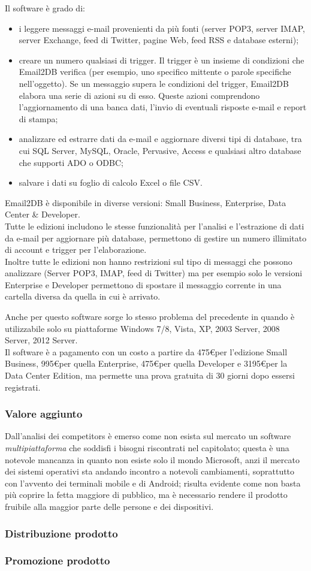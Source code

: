 Il software è grado di:
\begin{itemize}
\item i leggere messaggi e-mail provenienti da più fonti (server POP3, server IMAP, server Exchange, feed di Twitter, pagine Web, feed RSS e database esterni);
\item creare un numero qualsiasi di trigger. Il trigger è un insieme di condizioni che Email2DB verifica (per esempio, uno specifico mittente o parole specifiche nell'oggetto). Se un messaggio supera le condizioni del trigger, Email2DB elabora una serie di azioni su di esso. Queste azioni comprendono l'aggiornamento di una banca dati, l'invio di eventuali risposte e-mail e report di stampa;
\item analizzare ed estrarre dati da e-mail e aggiornare diversi tipi di database, tra cui SQL Server, MySQL, Oracle, Pervasive, Access e qualsiasi altro database che supporti ADO o ODBC;
\item salvare i dati su foglio di calcolo Excel o file CSV.
\end{itemize}

Email2DB è disponibile in diverse versioni: Small Business, Enterprise, Data Center \& Developer.\\
Tutte le edizioni includono le stesse funzionalità per l'analisi e l'estrazione di dati da e-mail per aggiornare più database, permettono di gestire un numero illimitato di account e trigger per l'elaborazione.\\
Inoltre tutte le edizioni non hanno restrizioni sul tipo di messaggi che possono analizzare (Server POP3, IMAP, feed di Twitter) ma per esempio solo le versioni Enterprise e Developer permettono di spostare il messaggio corrente in una cartella diversa da quella in cui è arrivato.

Anche per questo software sorge lo stesso problema del precedente in quando è utilizzabile solo su piattaforme Windows 7/8, Vista, XP, 2003 Server, 2008 Server, 2012 Server.\\
Il software è a pagamento con un costo a partire da 475\euro per l'edizione Small Business, 995\euro per quella Enterprise, 475\euro per quella Developer e 3195\euro per la Data Center Edition, ma permette una prova gratuita di 30 giorni dopo essersi registrati.

\subsubsection{Valore aggiunto}
Dall'analisi dei competitors è emerso come non esista sul mercato un software \emph{multipiattaforma} che soddisfi i bisogni riscontrati nel capitolato; questa è una notevole mancanza in quanto non esiste solo il mondo Microsoft, anzi il mercato dei sistemi operativi sta andando incontro a notevoli cambiamenti, soprattutto con l'avvento dei terminali mobile e di Android; risulta evidente come non basta più coprire la fetta maggiore di pubblico, ma è necessario rendere il prodotto fruibile alla maggior parte delle persone e dei dispositivi.

\subsubsection{Distribuzione prodotto}

\subsubsection{Promozione prodotto}